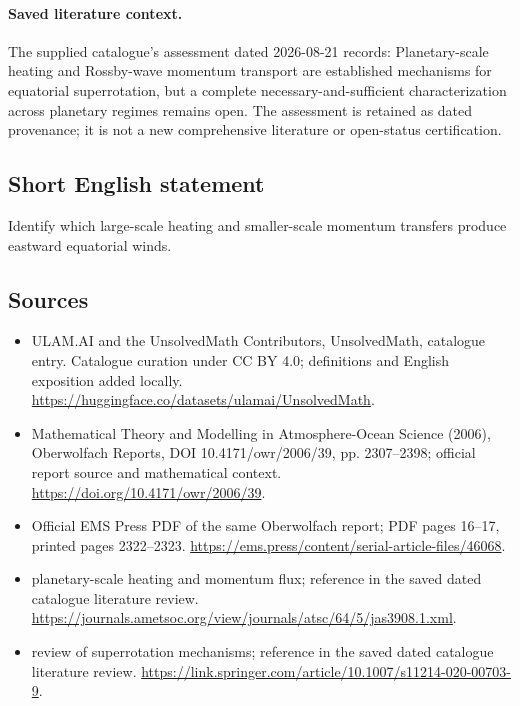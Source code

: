 \documentclass[11pt]{article}
\begin{document}
\paragraph{Saved literature context.} The supplied catalogue's assessment dated 2026-08-21 records: Planetary-scale heating and Rossby-wave momentum transport are established mechanisms for equatorial superrotation, but a complete necessary-and-sufficient characterization across planetary regimes remains open. The assessment is retained as dated provenance; it is not a new comprehensive literature or open-status certification.
\subsection{Short English statement}
Identify which large-scale heating and smaller-scale momentum transfers produce eastward equatorial winds.
\subsection{Sources}
\begin{itemize}
\item[\hypertarget{source:statement:1}{S1}] ULAM.AI and the UnsolvedMath Contributors, UnsolvedMath, catalogue entry. Catalogue curation under CC BY 4.0; definitions and English exposition added locally.
\url{https://huggingface.co/datasets/ulamai/UnsolvedMath}.
\item[\hypertarget{source:statement:2}{S2}] Mathematical Theory and Modelling in Atmosphere-Ocean Science (2006), Oberwolfach Reports, DOI 10.4171/owr/2006/39, pp. 2307--2398; official report source and mathematical context.
\url{https://doi.org/10.4171/owr/2006/39}.
\item[\hypertarget{source:statement:3}{S3}] Official EMS Press PDF of the same Oberwolfach report; PDF pages 16--17, printed pages 2322--2323.
\url{https://ems.press/content/serial-article-files/46068}.
\item[\hypertarget{source:statement:4}{S4}] planetary-scale heating and momentum flux; reference in the saved dated catalogue literature review.
\url{https://journals.ametsoc.org/view/journals/atsc/64/5/jas3908.1.xml}.
\item[\hypertarget{source:statement:5}{S5}] review of superrotation mechanisms; reference in the saved dated catalogue literature review.
\url{https://link.springer.com/article/10.1007/s11214-020-00703-9}.
\end{itemize}
\label{end:statement}
\end{document}
